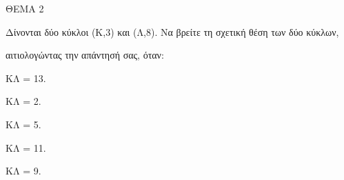 
ΘΕΜΑ 2

Δίνονται δύο κύκλοι (Κ,3) και (Λ,8). Να βρείτε τη σχετική θέση των δύο κύκλων,

αιτιολογώντας την απάντησή σας, όταν:

\begin{alist}
\item ΚΛ = 13. 

\item ΚΛ = 2. 

\item ΚΛ = 5. 

\item ΚΛ = 11. 

\item ΚΛ = 9. 
\end{alist}
